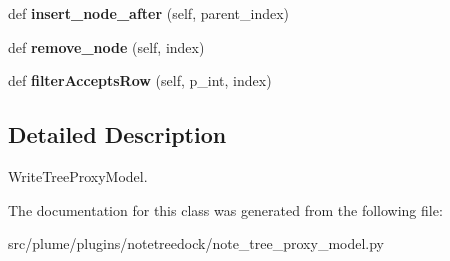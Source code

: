 \begin{DoxyCompactItemize}
\item 
def {\bfseries insert\+\_\+node\+\_\+after} (self, parent\+\_\+index)\hypertarget{classplume-creator_1_1src_1_1plume_1_1plugins_1_1notetreedock_1_1note__tree__proxy__model_1_1_note_tree_proxy_model_a0cd0a9d55279d382b5d6e58965ce6c51}{}\label{classplume-creator_1_1src_1_1plume_1_1plugins_1_1notetreedock_1_1note__tree__proxy__model_1_1_note_tree_proxy_model_a0cd0a9d55279d382b5d6e58965ce6c51}

\item 
def {\bfseries remove\+\_\+node} (self, index)\hypertarget{classplume-creator_1_1src_1_1plume_1_1plugins_1_1notetreedock_1_1note__tree__proxy__model_1_1_note_tree_proxy_model_af1c8feb80cfcfd5a3d1c8c10c20bcd16}{}\label{classplume-creator_1_1src_1_1plume_1_1plugins_1_1notetreedock_1_1note__tree__proxy__model_1_1_note_tree_proxy_model_af1c8feb80cfcfd5a3d1c8c10c20bcd16}

\item 
def {\bfseries filter\+Accepts\+Row} (self, p\+\_\+int, index)\hypertarget{classplume-creator_1_1src_1_1plume_1_1plugins_1_1notetreedock_1_1note__tree__proxy__model_1_1_note_tree_proxy_model_aa8b108e296c8d6e9a67aa1ae3a613321}{}\label{classplume-creator_1_1src_1_1plume_1_1plugins_1_1notetreedock_1_1note__tree__proxy__model_1_1_note_tree_proxy_model_aa8b108e296c8d6e9a67aa1ae3a613321}

\end{DoxyCompactItemize}


\subsection{Detailed Description}
Write\+Tree\+Proxy\+Model. 

The documentation for this class was generated from the following file\+:\begin{DoxyCompactItemize}
\item 
src/plume/plugins/notetreedock/note\+\_\+tree\+\_\+proxy\+\_\+model.\+py\end{DoxyCompactItemize}
